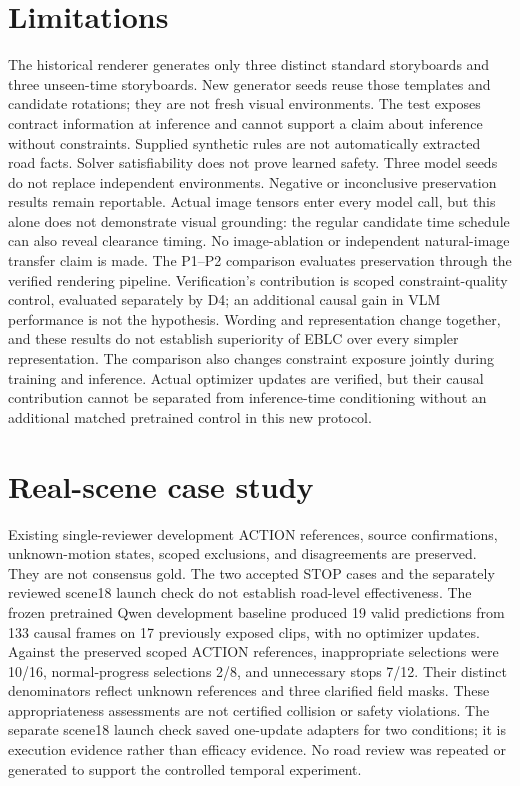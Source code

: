 \documentclass[11pt]{article}
\begin{document}
\section{Limitations}
The historical renderer generates only three distinct standard storyboards and
three unseen-time storyboards. New generator seeds reuse those templates and
candidate rotations; they are not fresh visual environments. The test exposes
contract information at inference and cannot support a claim about inference
without constraints. Supplied synthetic rules are not automatically extracted
road facts. Solver satisfiability does not prove learned safety. Three model
seeds do not replace independent environments. Negative or inconclusive
preservation results remain reportable.
Actual image tensors enter every model call, but this alone does not demonstrate
visual grounding: the regular candidate time schedule can also reveal clearance
timing. No image-ablation or independent natural-image transfer claim is made.
The P1--P2 comparison evaluates preservation through the verified rendering
pipeline. Verification's contribution is scoped constraint-quality control,
evaluated separately by D4; an additional causal gain in VLM performance is not
the hypothesis. Wording and representation change together, and these results
do not establish superiority of EBLC over every simpler representation.
The comparison also changes constraint exposure jointly during training and
inference. Actual optimizer updates are verified, but their causal contribution
cannot be separated from inference-time conditioning without an additional
matched pretrained control in this new protocol.
\section{Real-scene case study}
Existing single-reviewer development ACTION references, source confirmations,
unknown-motion states, scoped exclusions, and disagreements are preserved.
They are not consensus gold. The two accepted STOP cases and the separately
reviewed scene18 launch check do not establish road-level effectiveness.
The frozen pretrained Qwen development baseline produced 19 valid predictions
from 133 causal frames on 17 previously exposed clips, with no optimizer updates.
Against the preserved scoped ACTION references, inappropriate selections were
10/16, normal-progress selections 2/8, and unnecessary stops 7/12. Their distinct
denominators reflect unknown references and three clarified field masks. These
appropriateness assessments are not certified collision or safety violations.
The separate scene18 launch check saved one-update adapters for two conditions;
it is execution evidence rather than efficacy evidence. No road review was
repeated or generated to support the controlled temporal experiment.
\end{document}
